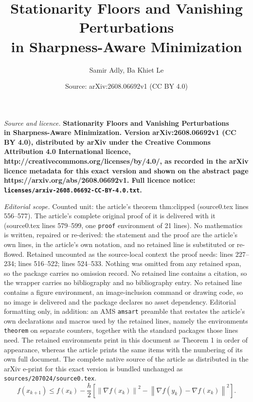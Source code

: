 \documentclass[10pt,a4paper]{amsart}
\title{\bf Stationarity Floors and Vanishing Perturbations\\ in Sharpness-Aware Minimization}
\author{Samir Adly, Ba Khiet Le}
\date{Source: arXiv:2608.06692v1 (CC BY 4.0)}
\newcommand{\norm}[1]{\left\lVert #1\right\rVert}
\begin{document}
\maketitle

\noindent\emph{Source and licence.} \bf Stationarity Floors and Vanishing Perturbations\\ in Sharpness-Aware Minimization. Version arXiv:2608.06692v1 (CC BY 4.0), distributed by arXiv under the Creative Commons Attribution 4.0 International licence, http://creativecommons.org/licenses/by/4.0/, as recorded in the arXiv licence metadata for this exact version and shown on the abstract page https://arxiv.org/abs/2608.06692v1. Full licence notice: \texttt{licenses/arxiv-2608.06692-CC-BY-4.0.txt}.\par\smallskip

\noindent\textit{Editorial scope.} Counted unit: the article's theorem thm:clipped (source0.tex lines 556--577). The article's complete original proof of it is delivered with it (source0.tex lines 579--599, one \texttt{proof} environment of 21 lines). No mathematics is written, repaired or re-derived: the statement and the proof are the article's own lines, in the article's own notation, and no retained line is substituted or re-flowed.  Retained uncounted as the source-local context the proof needs: lines 227--234; lines 516--522; lines 524--533.  Nothing was omitted from any retained span, so the package carries no omission record.  No retained line contains a citation, so the wrapper carries no bibliography and no bibliography entry.  No retained line contains a figure environment, an image-inclusion command or drawing code, so no image is delivered and the package declares no asset dependency.  Editorial formatting only, in addition: an AMS \texttt{amsart} preamble that restates the article's own declarations and macros used by the retained lines, namely the environments \texttt{theorem} on separate counters, together with the standard packages those lines need.  The retained environments print in this document as Theorem 1 in order of appearance, whereas the article prints the same items with the numbering of its own full document.  The complete native source of the article as distributed in the arXiv e-print for this exact version is bundled unchanged as \texttt{sources/207024/source0.tex}.
\begin{equation}\label{eq:perturbed-descent}
  f(x_{k+1})
  \leq f(x_k)
  -\frac{h}{2}\left[
       \norm{\nabla f(x_k)}^2
       -\norm{\nabla f(y_k)-\nabla f(x_k)}^2
     \right].
\end{equation}
\end{document}
